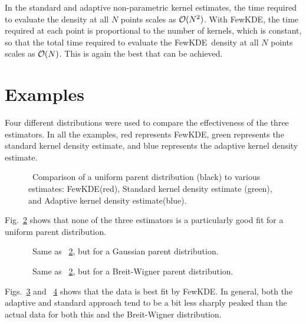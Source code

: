 \documentclass[prd,twocolumn]{revtex4}
\def\FewKDE{{\sc FewKDE}}
\def\nMC{N}
\begin{document}
\begin{figure}[htp]
\label{fig:timegraph}
\end{figure}

In the standard and adaptive non-parametric kernel estimates, the time required to evaluate the density at all $\nMC$ points scales as ${\cal O}({\nMC}^2)$.  With \FewKDE, the time required at each point is proportional to the number of kernels, which is constant, so that the total time required to evaluate the \FewKDE\ density at all $\nMC$ points scales as ${\cal O}(\nMC)$.  This is again the best that can be achieved. 

\section{Examples}

Four different distributions were used to compare the effectiveness of the three estimators.  In all the examples, red represents FewKDE, green represents the standard kernel density estimate, and blue represents the adaptive kernel density estimate.

\begin{figure}[htp]
\caption{\ Comparison of a uniform parent distribution (black) to various estimates: \FewKDE (red), Standard kernel density estimate (green), and Adaptive kernel density estimate(blue). }
\label{fig:1Dbox}
\end{figure}

Fig.~\ref{fig:1Dbox} shows that none of the three estimators is a particularly good fit for a uniform parent distribution.

\begin{figure}[htp]
\caption{\ Same as ~\ref{fig:1Dbox}, but for a Gaussian parent distribution.}
\label{fig:1Dgauss}
\end{figure}

\begin{figure}[htp]
\caption{\ Same as ~\ref{fig:1Dbox}, but for a Breit-Wigner parent distribution.}
\label{fig:1Dbw}
\end{figure}

Figs.~\ref{fig:1Dgauss} and ~\ref{fig:1Dbw} shows that the data is best fit by FewKDE.  In general, both the adaptive and standard approach tend to be a bit less sharply peaked than the actual data for both this and the Breit-Wigner distribution.
\end{document}
